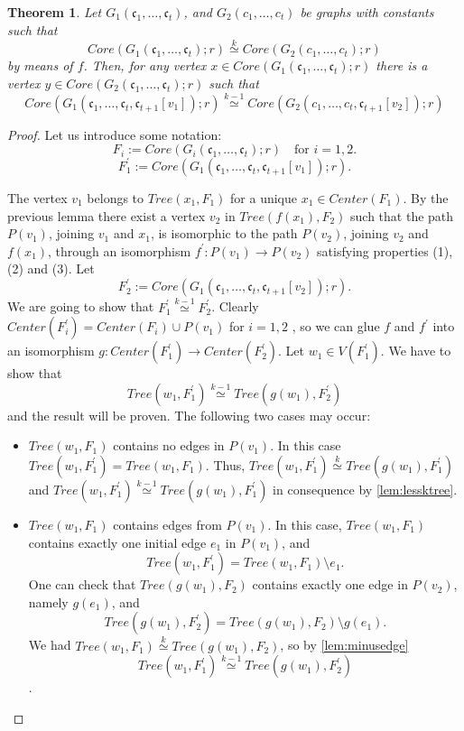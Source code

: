 \documentclass[11pt,notitlepage,a4paper]{article}
\newtheorem{theorem}{Theorem}[section]
\theoremstyle{definition}
\newcommand{\cc}{\mathfrak{c}}
\newcommand{\morph}[1]{\stackrel{#1}{\simeq}}
\begin{document}
\begin{theorem} \label{thm:chooseconstant}
	Let $G_1(\cc_1,\dots, \cc_t)$, and $G_2(c_1,\dots,c_t)$ be graphs
	with constants such that 
	\[ Core(G_1(\cc_1,\dots, \cc_t);r)\morph{k} Core(G_2(c_1,\dots,c_t);r)\]
	by means of $f$. 
	Then, for any vertex $x\in Core(G_1(\cc_1,\dots, \cc_t);r)$ there is a vertex
	$y\in Core(G_2(\cc_1,\dots, \cc_t);r)$ such that 
	\[Core(G_1(\cc_1,\dots, \cc_t,\cc_{t+1}[v_1]);r)\morph{k-1} Core(G_2(c_1,\dots,c_t,\cc_{t+1}[v_2]);r)\]
\end{theorem}
\begin{proof}
	Let us introduce some notation:
	\[F_i:=Core(G_i(\cc_1,\dots, \cc_t);r)\quad \text{for }i=1,2. \]
	\[F^\prime_1:=Core(G_1(\cc_1,\dots, \cc_t,\cc_{t+1}[v_1]);r).\]
	
	The vertex $v_1$ belongs to $Tree(x_1,F_1)$
	for a unique $x_1\in Center(F_1)$. By the previous lemma there exist a vertex $v_2$ in 
	$Tree(f(x_1),F_2)$ such that the path $P(v_1)$, 
	joining $v_1$ and $x_1$, is isomorphic to the path
	$P(v_2)$, joining $v_2$ and $f(x_1)$, through an isomorphism $f^\prime: P(v_1)
	\rightarrow P(v_2)$ satisfying properties (1), (2) and (3). 
	Let 
	\[F^\prime_2:=Core(G_1(\cc_1,\dots, \cc_t,\cc_{t+1}[v_2]);r).\]
	We are going to show that $F^\prime_1\morph{k-1}F^\prime_2$.
	Clearly $Center(F^\prime_i)=Center(F_i)\cup P(v_1)$ for $i=1,2$ , so we can glue
	$f$ and $f^\prime$ into an isomorphism $g:Center(F^\prime_1)\rightarrow Center(F^\prime_2)$.
	Let $w_1\in V(F^\prime_1)$. We have to show that 
	\[Tree(w_1, F^\prime_1)\morph{k-1} Tree(g(w_1), F^\prime_2)\]
	and the result will be proven. The following two cases may occur:
	\begin{itemize}[leftmargin=*]
		\item $Tree(w_1,F_1)$ contains no edges in $P(v_1)$. 
		In this case $Tree(w_1,F^\prime_1)=Tree(w_1,F_1)$.
		Thus, $Tree(w_1,F^\prime_1)\morph{k} Tree(g(w_1),F^\prime_1)$
		and $Tree(w_1,F^\prime_1)\morph{k-1} Tree(g(w_1),F^\prime_1)$
		in consequence by \cref{lem:lessktree}.
		\item $Tree(w_1,F_1)$ contains edges from $P(v_1)$.
		In this case, $Tree(w_1,F_1)$ contains exactly one initial edge
		$e_1$ in $P(v_1)$, and 
		\[Tree(w_1,F^\prime_1)=Tree(w_1,F_1)\setminus e_1. \]
		One can check that $Tree(g(w_1),F_2)$ contains exactly one edge
		in $P(v_2)$, namely $g(e_1)$, and 
		\[Tree(g(w_1),F^\prime_2)=Tree(g(w_1),F_2)\setminus g(e_1).\]
		We had $Tree(w_1,F_1)\morph{k}Tree(g(w_1),F_2)$, so by
		\cref{lem:minusedge}
		\[Tree(w_1,F^\prime_1)\morph{k-1}Tree(g(w_1),F^\prime_2)\].	
	\end{itemize}
\end{proof}
\end{document}
